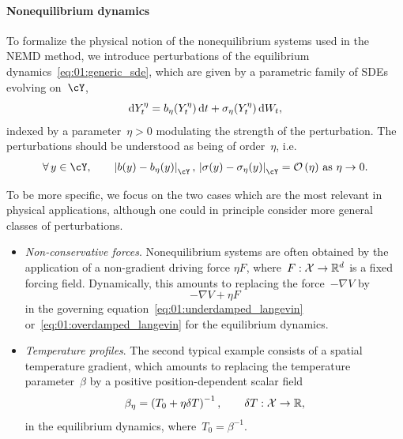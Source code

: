 \paragraph{Nonequilibrium dynamics}
\label{subsec:nemd_dynamics}
To formalize the physical notion of the nonequilibrium systems used in the NEMD method, we introduce perturbations of the equilibrium dynamics~\eqref{eq:01:generic_sde}, which are given by a parametric family of SDEs evolving on~$\cY$,
\begin{equation}
    \label{eq:01:nemd_dynamics}
    \mathrm{d} Y^\eta_t = b_\eta(Y_t^\eta)\,\mathrm{d} t + \sigma_\eta(Y_t^\eta)\,\mathrm{d} W_t,
\end{equation}
indexed by a parameter~$\eta>0$ modulating the strength of the perturbation. The perturbations should be understood as being of order~$\eta$, i.e.
\begin{equation}
    \label{eq:01:linear_forcing}
    \forall\,y\in\cY,\qquad\left|b(y)-b_\eta(y)\right|_{\cY},\, \left|\sigma(y)-\sigma_\eta(y)\right|_{\cY} = \bigo\left(\eta\right)\,\text{as }\eta\to 0.
\end{equation}

To be more specific, we focus on the two cases which are the most relevant in physical applications, although one could in principle consider more general classes of perturbations.
\begin{itemize}
    \item{\textit{Non-conservative forces}. Nonequilibrium systems are often obtained by the application of a non-gradient driving force $\eta F$, where~$F:\mathcal{X}\to\mathbb{R}^d$ is a fixed forcing field. Dynamically, this amounts to replacing the force~$-\nabla V$ by
\begin{equation}
    \label{eq:01:non_conservative_force}
    -\nabla V + \eta F
\end{equation}
in the governing equation~\eqref{eq:01:underdamped_langevin} or~\eqref{eq:01:overdamped_langevin} for the equilibrium dynamics.}

\item{\textit{Temperature profiles}. The second typical example consists of a spatial temperature gradient, which amounts to replacing the temperature parameter~$\beta$ by a positive position-dependent scalar field
\begin{equation}
    \label{eq:01:nemd_temperature_profile}
    \beta_\eta = \left(T_0 +\eta\delta T\right)^{-1},\qquad \delta T:\mathcal{X}\to\mathbb{R},
\end{equation}
in the equilibrium dynamics, where~$T_0=\beta^{-1}$.}
\end{itemize}

